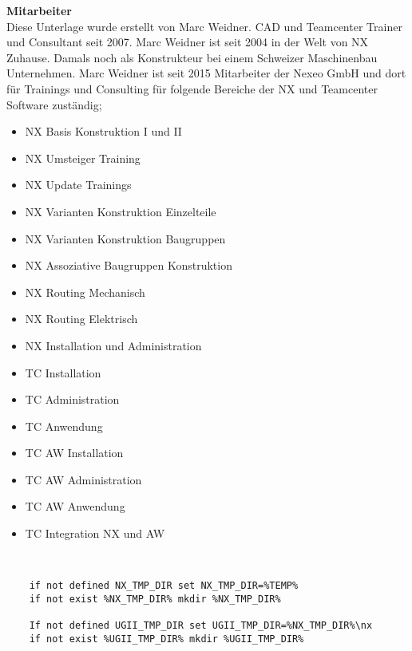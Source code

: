 \textbf{Mitarbeiter}\\
Diese Unterlage wurde erstellt von Marc Weidner. CAD und Teamcenter Trainer und Consultant seit 2007. Marc Weidner ist seit 2004 in der Welt von NX \textsuperscript{\texttrademark} Zuhause. Damals noch als Konstrukteur bei einem Schweizer Maschinenbau Unternehmen. Marc Weidner ist seit 2015 Mitarbeiter der Nexeo GmbH und dort für Trainings und Consulting für folgende Bereiche der NX \textsuperscript{\texttrademark} und Teamcenter \textsuperscript{\texttrademark} Software zuständig;\\
\begin{itemize}
	\item NX \textsuperscript{\texttrademark} Basis Konstruktion I und II
	\item NX \textsuperscript{\texttrademark} Umsteiger Training
	\item NX \textsuperscript{\texttrademark} Update Trainings
	\item NX \textsuperscript{\texttrademark} Varianten Konstruktion Einzelteile
	\item NX \textsuperscript{\texttrademark} Varianten Konstruktion Baugruppen
	\item NX \textsuperscript{\texttrademark} Assoziative Baugruppen Konstruktion
	\item NX \textsuperscript{\texttrademark} Routing Mechanisch
	\item NX \textsuperscript{\texttrademark} Routing Elektrisch
	\item NX \textsuperscript{\texttrademark} Installation und Administration
	\item TC \textsuperscript{\texttrademark} Installation
	\item TC \textsuperscript{\texttrademark} Administration
	\item TC \textsuperscript{\texttrademark} Anwendung
	\item TC \textsuperscript{\texttrademark} AW Installation
	\item TC \textsuperscript{\texttrademark} AW Administration
	\item TC \textsuperscript{\texttrademark} AW Anwendung
	\item TC \textsuperscript{\texttrademark} Integration NX und AW \textsuperscript{\texttrademark}
\end{itemize}



\\
\begin{lstlisting}
	if not defined NX_TMP_DIR set NX_TMP_DIR=%TEMP%
	if not exist %NX_TMP_DIR% mkdir %NX_TMP_DIR%
	
	If not defined UGII_TMP_DIR set UGII_TMP_DIR=%NX_TMP_DIR%\nx
	if not exist %UGII_TMP_DIR% mkdir %UGII_TMP_DIR%
\end{lstlisting}



